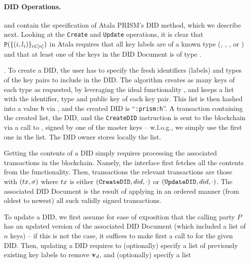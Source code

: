 \paragraph{DID Operations.} %
 and  contain the
specification of Atala PRISM's DID method,
which we describe next. Looking at the \texttt{Create} and \texttt{Update}
operations, it is clear that $\mathtt{P}(\lbrace (i, l_i) \rbrace_{i\in[n]})$ in
Atala requires that all key labels are of a known type (\MasterKey, \IssueKey,
\CommKey, or \AuthKey) and that at least one of the keys in the DID Document
is of type \MasterKey.

\begin{description}
\item{.} %
  To create a DID, the user has to specify the fresh identifiers (labels) and
  types of the key pairs to include in the DID. The  algorithm
  creates as many keys of each type as requested, by leveraging the ideal
  functionality \IdealFSig, and keeps a list with the identifier, type and
  public key of each key pair. This list is then hashed into a value \texttt{h}
  via \IdealGRO, and the created DID is ``\texttt{\did:prism:h}''. A transaction
  containing the created list, the DID, and the \texttt{CreateDID} instruction
  is sent to the blockchain via a call to \IdealGdledger, signed by one of the
  master keys -- w.l.o.g., we 
  simply use the first one in the list. The DID owner stores locally the list.
\item[\uccmd{Read}.] %
  Getting the contents of a DID simply requires processing the associated
  transactions in the blockchain. Namely, the interface first fetches all the
  contents from the \IdealGdledger functionality. Then, transactions the
  relevant transactions are those with $(tx,\sigma)$ where $tx$
  is either $(\texttt{CreateDID},did,\cdot)$ or $(\texttt{UpdateDID},did,
  \cdot)$. The associated DID Document is the result of applying in an ordered
  manner (from oldest to newest) all such validly signed transactions.
\item[\uccmd{Update}.] %
  To update a DID, we first assume for ease of exposition that the calling party
  $P$ has an updated version of the associated DID Document (which included
  a list of $n$ keys) -- if this is not the case, it suffices to make first a
  call to  for the given DID.
  Then, updating a DID requires to (optionally) specify a list of previously
  existing key labels to remove $\mathbf{v}_d$, and (optionally) specify a list

\end{description}
